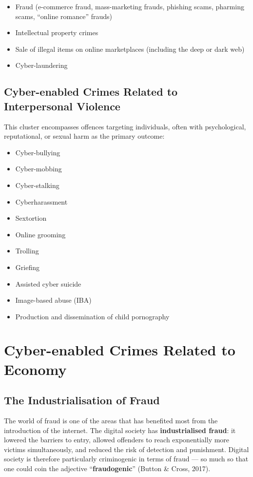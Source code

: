 \documentclass[11pt,a4paper,openany]{report}
\theoremstyle{definition}
\theoremstyle{plain}
\theoremstyle{remark}
\begin{document}
\begin{itemize}
    \item Fraud (e-commerce fraud, mass-marketing frauds, phishing scams, pharming scams, ``online romance'' frauds)
    \item Intellectual property crimes
    \item Sale of illegal items on online marketplaces (including the deep or dark web)
    \item Cyber-laundering
\end{itemize}

\subsection{Cyber-enabled Crimes Related to Interpersonal Violence}

This cluster encompasses offences targeting individuals, often with psychological, reputational, or sexual harm as the primary outcome:

\begin{itemize}
    \item Cyber-bullying
    \item Cyber-mobbing
    \item Cyber-stalking
    \item Cyberharassment
    \item Sextortion
    \item Online grooming
    \item Trolling
    \item Griefing
    \item Assisted cyber suicide
    \item Image-based abuse (IBA)
    \item Production and dissemination of child pornography
\end{itemize}


\section{Cyber-enabled Crimes Related to Economy}

\subsection{The Industrialisation of Fraud}

The world of fraud is one of the areas that has benefited most from the introduction of the internet. The digital society has \textbf{industrialised fraud}: it lowered the barriers to entry, allowed offenders to reach exponentially more victims simultaneously, and reduced the risk of detection and punishment. Digital society is therefore particularly criminogenic in terms of fraud --- so much so that one could coin the adjective ``\textbf{fraudogenic}'' (Button \& Cross, 2017).
\end{document}

